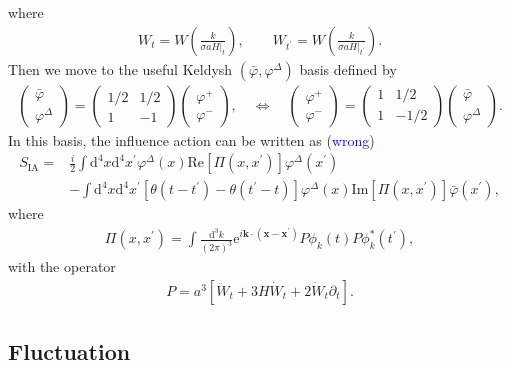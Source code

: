 \documentclass[aps, prd
, preprint
, nofootinbib 
]{revtex4-1}
\newcommand{\dd}{\mathrm{d}}
\newcommand{\ee}{\mathrm{e}}
\renewcommand{\Re}{\mathrm{Re}}
\renewcommand{\Im}{\mathrm{Im}}
\newcommand{\dk}{\frac{\dd^3k}{(2\pi)^3}}
\newcommand{\bae}[1]{\begin{align} #1 \end{align}}
\newcommand{\bpme}[1]{\begin{pmatrix} #1 \end{pmatrix}}
\newcommand{\Blue}[1]{\textcolor{blue}{\sffamily #1}}
\begin{document}
where 
\bae{
	W_t=W\left(\frac{k}{\sigma aH|_t}\right), \quad\quad W_{t^\prime}=W\left(\frac{k}{\sigma aH|_{t^\prime}}\right).
}
Then we move to the useful Keldysh $(\bar{\varphi},\varphi^\Delta)$ basis defined by
\bae{
	\bpme{
		\bar{\varphi} \\
		\varphi^\Delta
	}=\bpme{
		1/2 & 1/2 \\
		1 & -1
	}\bpme{
		\varphi^+ \\
		\varphi^-
	}, \quad \Leftrightarrow \quad
	\bpme{
		\varphi^+ \\
		\varphi^-
	}=\bpme{
		1& 1/2 \\
		1 & -1/2
	}\bpme{
		\bar{\varphi} \\
		\varphi^\Delta
	}.
}
In this basis, the influence action can be written as (\Blue{wrong})
\bae{
	S_\text{IA}=&\frac{i}{2}\int\dd^4x\dd^4x^\prime\varphi^\Delta(x)\Re[\Pi(x,x^\prime)]\varphi^\Delta(x^\prime) \nonumber \\
	&-\int\dd^4x\dd^4x^\prime[\theta(t-t^\prime)-\theta(t^\prime-t)]\varphi^\Delta(x)\Im[\Pi(x,x^\prime)]\bar{\varphi}(x^\prime),
}
where
\bae{
	\Pi(x,x^\prime)=\int\dk\ee^{i\mathbf{k}\cdot(\mathbf{x}-\mathbf{x}^\prime)}P\phi_k(t)P\phi^*_k(t^\prime),
}
with the operator
\bae{
	P=a^3\left[\ddot{W}_t+3H\dot{W}_t+2\dot{W}_t\partial_t\right].
}



\subsection{Fluctuation}
\end{document}
